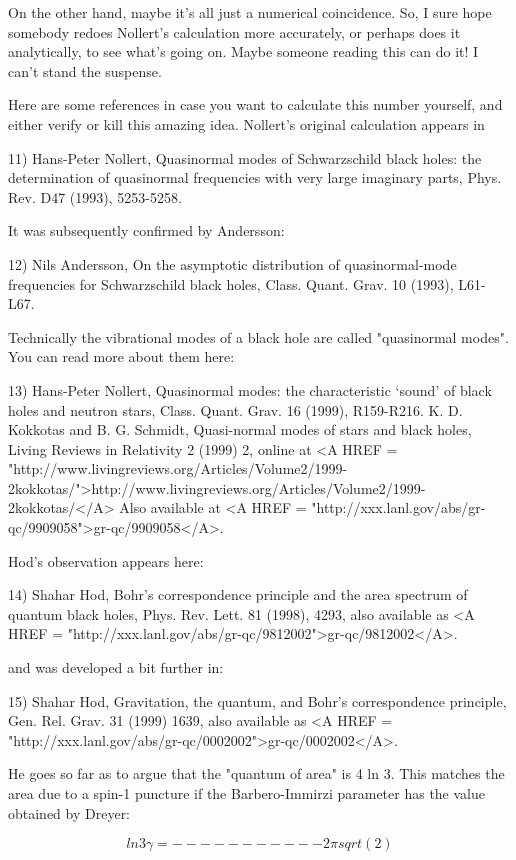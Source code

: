 On the other hand, maybe it's all just a numerical coincidence.  So, 
I sure hope somebody redoes Nollert's calculation more accurately, or
perhaps does it analytically, to see what's going on.  Maybe someone
reading this can do it!  I can't stand the suspense.

Here are some references in case you want to calculate this number
yourself, and either verify or kill this amazing idea.  Nollert's
original calculation appears in

11) Hans-Peter Nollert, Quasinormal modes of Schwarzschild black
holes: the determination of quasinormal frequencies with very large
imaginary parts, Phys. Rev. D47 (1993), 5253-5258.

It was subsequently confirmed by Andersson:

12) Nils Andersson, On the asymptotic distribution of quasinormal-mode
frequencies for Schwarzschild black holes, Class. Quant. Grav. 10
(1993), L61-L67.  

Technically the vibrational modes of a black hole are called
"quasinormal modes".  You can read more about them here:

13) Hans-Peter Nollert, Quasinormal modes: the characteristic
`sound' of black holes and neutron stars, Class. Quant. Grav. 16
(1999), R159-R216.
K. D. Kokkotas and B. G. Schmidt, Quasi-normal modes of stars
and black holes, Living Reviews in Relativity 2 (1999) 2, 
online at <A HREF = "http://www.livingreviews.org/Articles/Volume2/1999-2kokkotas/">http://www.livingreviews.org/Articles/Volume2/1999-2kokkotas/</A>
Also available at <A HREF = "http://xxx.lanl.gov/abs/gr-qc/9909058">gr-qc/9909058</A>.

Hod's observation appears here:

14) Shahar Hod, Bohr's correspondence principle and the area spectrum 
of quantum black holes, Phys. Rev. Lett. 81 (1998), 4293, also available 
as <A HREF = "http://xxx.lanl.gov/abs/gr-qc/9812002">gr-qc/9812002</A>.

and was developed a bit further in:

15) Shahar Hod, Gravitation, the quantum, and Bohr's correspondence
principle, Gen. Rel. Grav. 31 (1999) 1639, also available as <A HREF = "http://xxx.lanl.gov/abs/gr-qc/0002002">gr-qc/0002002</A>.

He goes so far as to argue that the "quantum of area" is 4 ln 3.
This matches the area due to a spin-1 puncture if the Barbero-Immirzi
parameter has the value obtained by Dreyer:

$$
            ln 3
\gamma  = -----------
        2 \pi  sqrt(2)
$$
    
